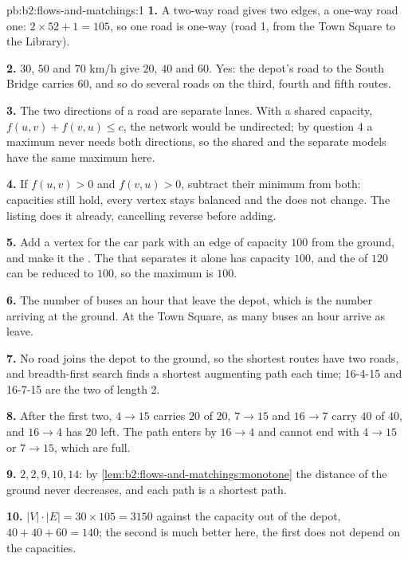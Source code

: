 \begin{solution}{pb:b2:flows-and-matchings:1}
\textbf{1.} A two-way road gives two edges, a one-way road one: $2 \times 52 + 1 = 105$, so one road is one-way (road 1,
from the Town Square to the Library).

\textbf{2.} $30$, $50$ and $70$ km/h give $20$, $40$ and $60$. Yes: the depot's road to the South Bridge carries $60$,
and so do several roads on the third, fourth and fifth routes.

\textbf{3.} The two directions of a road are separate lanes. With a shared capacity, $f(u, v) + f(v, u) \leq c$, the
network would be undirected; by question 4 a maximum  never needs both directions, so the shared and the separate
models have the same maximum here.

\textbf{4.} If $f(u, v) > 0$ and $f(v, u) > 0$, subtract their minimum from both: capacities still hold, every vertex
stays balanced and the  does not change. The listing does it already, cancelling reverse  before adding.

\textbf{5.} Add a vertex for the car park with an edge of capacity $100$ from the ground, and make it the . The 
that separates it alone has capacity $100$, and the  of $120$ can be reduced to $100$, so the maximum is $100$.

\textbf{6.} The number of buses an hour that leave the depot, which is the number arriving at the ground. At the Town
Square, as many buses an hour arrive as leave.

\textbf{7.} No road joins the depot to the ground, so the shortest routes have two roads, and breadth-first search
finds a shortest augmenting path each time; 16-4-15 and 16-7-15 are the two of length 2.

\textbf{8.} After the first two, $4 \to 15$ carries $20$ of $20$, $7 \to 15$ and $16 \to 7$ carry $40$ of $40$, and
$16 \to 4$ has $20$ left. The path enters by $16 \to 4$ and cannot end with $4 \to 15$ or $7 \to 15$, which are full.

\textbf{9.} $2, 2, 9, 10, 14$: by \cref{lem:b2:flows-and-matchings:monotone} the distance of the ground never decreases,
and each path is a shortest path.

\textbf{10.} $|V| \cdot |E| = 30 \times 105 = 3150$ against the capacity out of the depot, $40 + 40 + 60 = 140$; the
second is much better here, the first does not depend on the capacities.


\end{solution}
